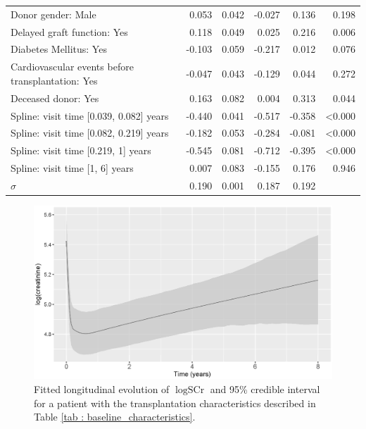 \begin{table}[!htb]
\begin{center}
\begin{tabular}{lrrrrr}
Donor gender: Male                                                                      & 0.053  & 0.042    & -0.027 & 0.136  & 0.198          \\
Delayed graft function: Yes                                                                       & 0.118  & 0.049    & 0.025  & 0.216  & 0.006          \\
Diabetes Mellitus: Yes                                                                        & -0.103 & 0.059    & -0.217 & 0.012  & 0.076          \\
Cardiovascular events before transplantation: Yes                                                                     & -0.047 & 0.043    & -0.129 & 0.044  & 0.272          \\
Deceased donor: Yes                                                                 & 0.163  & 0.082    & 0.004  & 0.313  & 0.044          \\
Spline: visit time [0.039, 0.082] years & -0.440 & 0.041    & -0.517 & -0.358 & \textless0.000 \\
Spline: visit time [0.082, 0.219] years & -0.182 & 0.053    & -0.284 & -0.081 & \textless0.000 \\
Spline: visit time [0.219, 1] years & -0.545 & 0.081    & -0.712 & -0.395 & \textless0.000 \\
Spline: visit time [1, 6] years & 0.007  & 0.083    & -0.155 & 0.176  & 0.946          \\
$\sigma$                                                                            & 0.190  & 0.001    & 0.187  & 0.192  & \\
\hline
\end{tabular}
\end{center}
\end{table}

\begin{figure}[!htb]
\centerline{\includegraphics[width=\columnwidth]{images/creatinine.eps}}
\caption{Fitted longitudinal evolution of $\log \text{SCr}$ and 95\% credible interval for a patient with the  transplantation characteristics described in Table \ref{tab : baseline_characteristics}.}
\label{fig : creatinine_evolution}
\end{figure}

